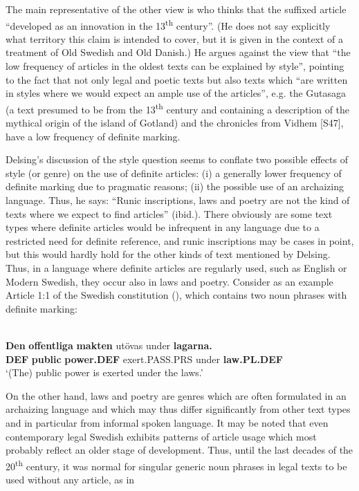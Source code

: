 The main representative of the other view is \citet[938-939]{Delsing2002} who thinks that the suffixed article “developed as an innovation in the 13\textsuperscript{th} century”. (He does not say explicitly what territory this claim is intended to cover, but it is given in the context of a treatment of Old Swedish and Old Danish.) He argues against the view that “the low frequency of articles in the oldest texts can be explained by style”, pointing to the fact that not only legal and poetic texts but also texts which “are written in styles where we would expect an ample use of the articles”,  e.g. the Gutasaga (a text presumed to be from the 13\textsuperscript{th} century and containing a description of the mythical origin of the island of Gotland) and the chronicles from Vidhem [S47], have a low frequency of definite marking. 

Delsing’s discussion of the style question seems to conflate two possible effects of style (or genre) on the use of definite articles: (i) a generally lower frequency of definite marking due to pragmatic reasons; (ii) the possible use of an archaizing language. Thus, he says: “Runic inscriptions, laws and poetry are not the kind of texts where we expect to find articles” (ibid.). There obviously are some text types where definite articles would be infrequent in any language due to a restricted need for definite reference, and runic inscriptions may be cases in point, but this would hardly hold for the other kinds of text mentioned by Delsing. Thus, in a language where definite articles are regularly used, such as English or Modern Swedish, they occur also in laws and poetry. Consider as an example Article 1:1 of the Swedish constitution (), which contains two noun phrases with definite marking:

\ea\label{}
\\
\gll 	\textbf{Den} \textbf{  offentliga} \textbf{  makten} utövas  under  \textbf{lagarna.}\\
		\textbf{DEF} \textbf{public} \textbf{power.DEF} exert.PASS.PRS  under  \textbf{law.PL.DEF}\\
\glt  ‘(The) public power is exerted under the laws.’

\z

On the other hand, laws and poetry are genres which are often formulated in an archaizing language and which may thus differ significantly from other text types and in particular from informal spoken language. It may be noted that even contemporary legal Swedish exhibits patterns of article usage which most probably reflect an older stage of development. Thus, until the last decades of the 20\textsuperscript{th} century, it was normal for singular generic noun phrases in legal texts to be used without any article, as in 

